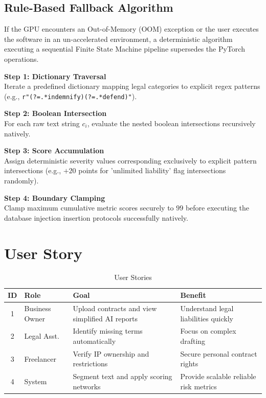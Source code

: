\documentclass[a4paper,12pt]{report}
\begin{document}
\subsection{Rule-Based Fallback Algorithm}

If the GPU encounters an Out-of-Memory (OOM) exception or the user executes the software in an un-accelerated environment, a deterministic algorithm executing a sequential Finite State Machine pipeline supersedes the PyTorch operations.

\vspace{0.3cm}
\noindent\textbf{Step 1: Dictionary Traversal}\\
Iterate a predefined dictionary mapping legal categories to explicit regex patterns (e.g., \texttt{r"(?=.*indemnify)(?=.*defend)"}).

\noindent\textbf{Step 2: Boolean Intersection}\\
For each raw text string $c_i$, evaluate the nested boolean intersections recursively natively.

\noindent\textbf{Step 3: Score Accumulation}\\
Assign deterministic severity values corresponding exclusively to explicit pattern intersections (e.g., $+20$ points for 'unlimited liability' flag intersections randomly).

\noindent\textbf{Step 4: Boundary Clamping}\\
Clamp maximum cumulative metric scores securely to $99$ before executing the database injection insertion protocols successfully natively.

\section{User Story}

\begin{table}[H]
\centering
\caption{User Stories}
\vspace{8pt}
\label{tab:userstory}
\renewcommand{\arraystretch}{1.3}
\begin{tabular}{|c|l|p{4.5cm}|p{4cm}|}
\hline
\textbf{ID} & \textbf{Role} & \textbf{Goal} & \textbf{Benefit} \\
\hline
1 & Business Owner & Upload contracts and view simplified AI reports & Understand legal liabilities quickly \\
2 & Legal Asst. & Identify missing terms automatically & Focus on complex drafting \\
3 & Freelancer & Verify IP ownership and restrictions & Secure personal contract rights \\
4 & System & Segment text and apply scoring networks & Provide scalable reliable risk metrics \\
\hline
\end{tabular}
\end{table}
\end{document}
